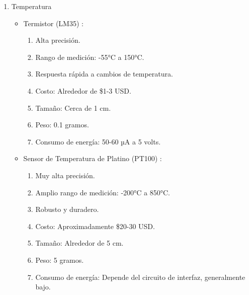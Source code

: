 \begin{enumerate}
\item Temperatura
\begin{itemize}
    \item Termistor (LM35) \cite{86}:
\begin{enumerate}
        \item Alta precisión.
        \item Rango de medición: -55°C a 150°C.
        \item Respuesta rápida a cambios de temperatura.
        \item Costo: Alrededor de \$1-3 USD.
        \item Tamaño: Cerca de 1 cm.
        \item Peso: 0.1 gramos.
        \item Consumo de energía: 50-60 µA a 5 volts.
\end{enumerate}
    \item Sensor de Temperatura de Platino (PT100) \cite{87}:
\begin{enumerate}
        \item Muy alta precisión.
        \item Amplio rango de medición: -200°C a 850°C.
        \item Robusto y duradero.
        \item Costo: Aproximadamente \$20-30 USD.
        \item Tamaño: Alrededor de 5 cm.
        \item Peso: 5 gramos.
        \item Consumo de energía: Depende del circuito de interfaz, generalmente bajo.

\end{enumerate}
\end{itemize}


\end{enumerate}
